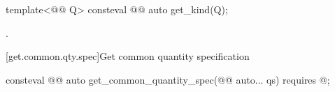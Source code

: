 \begin{itemdecl}
template<@@ Q>
consteval @@ auto get_kind(Q);
\end{itemdecl}

\begin{itemdescr}
\pnum
\returns
{}.
\end{itemdescr}

[get.common.qty.spec]{Get common quantity specification}

\begin{itemdecl}
consteval @@ auto get_common_quantity_spec(@@ auto... qs)
  requires @\seebelownc@;
\end{itemdecl}

